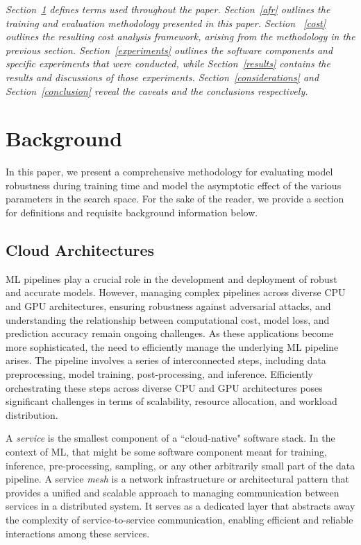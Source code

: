 \documentclass[conference]{IEEEtran}
\newcommand{\cm}[1]{\textit{{\color{blue}#1}}}
\begin{document}
\cm{Section~\ref{background} defines terms used throughout the paper. Section~\ref{afr} outlines the training and evaluation methodology presented in this paper.  Section ~\ref{cost} outlines the resulting cost analysis framework, arising from the methodology in the previous section. Section~\ref{experiments} outlines the software components and specific experiments that were conducted, while Section~\ref{results} contains the results and discussions of those experiments. Section~\ref{considerations} and Section~\ref{conclusion} reveal the caveats and the conclusions respectively.}


\section{Background}
\label{background}



In this paper, we present a comprehensive methodology for evaluating model robustness during training time and model the asymptotic effect of the various parameters in the search space. For the sake of the reader, we provide a section for definitions and requisite background information below.


\subsection{Cloud Architectures}


ML pipelines play a crucial role in the development and deployment of robust and accurate models. However, managing complex pipelines across diverse CPU and GPU architectures, ensuring robustness against adversarial attacks, and understanding the relationship between computational cost, model loss, and prediction accuracy remain ongoing challenges.
As these applications become more sophisticated, the need to efficiently manage the underlying ML pipeline arises. The pipeline involves a series of interconnected steps, including data preprocessing, model training, post-processing, and inference. Efficiently orchestrating these steps across diverse CPU and GPU architectures poses significant challenges in terms of scalability, resource allocation, and workload distribution.

A \textit{service} is the smallest component of a ``cloud-native" software stack. In the context of ML, that might be some software component meant for training, inference, pre-processing, sampling, or any other arbitrarily small part of the data pipeline. A service \textit{mesh} is a network infrastructure or architectural pattern that provides a unified and scalable approach to managing communication between services in a distributed system. It serves as a dedicated layer that abstracts away the complexity of service-to-service communication, enabling efficient and reliable interactions among these services. 
\end{document}
